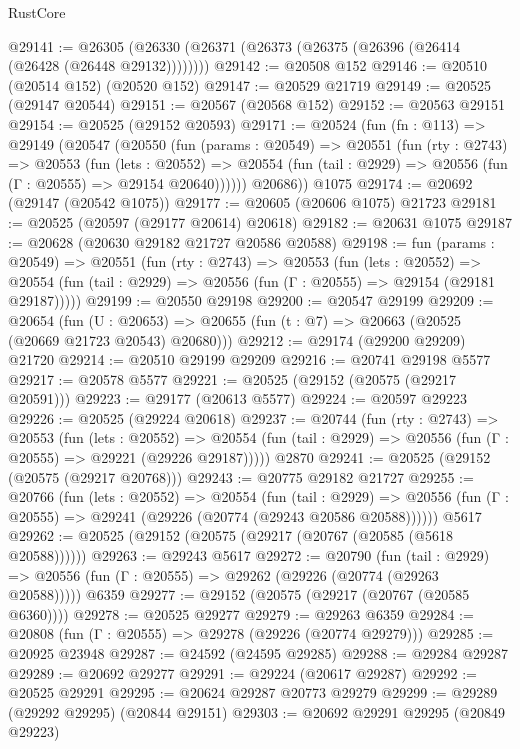 \begin{lexlean}{RustCore}
\begin{coremodule}
@29141 := @26305 (@26330 (@26371 (@26373 (@26375 (@26396 (@26414 (@26428 (@26448 @29132))))))))
@29142 := @20508 @152
@29146 := @20510 (@20514 @152) (@20520 @152)
@29147 := @20529 @21719
@29149 := @20525 (@29147 @20544)
@29151 := @20567 (@20568 @152)
@29152 := @20563 @29151
@29154 := @20525 (@29152 @20593)
@29171 := @20524
    (fun (fn : @113) =>
    @29149
      (@20547
        (@20550
          (fun (params : @20549) =>
          @20551
            (fun (rty : @2743) =>
            @20553
              (fun (lets : @20552) =>
              @20554 (fun (tail : @2929) => @20556 (fun (Γ : @20555) => @29154 @20640))))))
        @20686))
    @1075
@29174 := @20692 (@29147 (@20542 @1075))
@29177 := @20605 (@20606 @1075) @21723
@29181 := @20525 (@20597 (@29177 @20614) @20618)
@29182 := @20631 @1075
@29187 := @20628 (@20630 @29182 @21727 @20586 @20588)
@29198 := fun (params : @20549) =>
  @20551
    (fun (rty : @2743) =>
    @20553
      (fun (lets : @20552) =>
      @20554 (fun (tail : @2929) => @20556 (fun (Γ : @20555) => @29154 (@29181 @29187)))))
@29199 := @20550 @29198
@29200 := @20547 @29199
@29209 := @20654
    (fun (U : @20653) => @20655 (fun (t : @7) => @20663 (@20525 (@20669 @21723 @20543) @20680)))
@29212 := @29174 (@29200 @29209) @21720
@29214 := @20510 @29199 @29209
@29216 := @20741 @29198 @5577
@29217 := @20578 @5577
@29221 := @20525 (@29152 (@20575 (@29217 @20591)))
@29223 := @29177 (@20613 @5577)
@29224 := @20597 @29223
@29226 := @20525 (@29224 @20618)
@29237 := @20744
    (fun (rty : @2743) =>
    @20553
      (fun (lets : @20552) =>
      @20554 (fun (tail : @2929) => @20556 (fun (Γ : @20555) => @29221 (@29226 @29187)))))
    @2870
@29241 := @20525 (@29152 (@20575 (@29217 @20768)))
@29243 := @20775 @29182 @21727
@29255 := @20766
    (fun (lets : @20552) =>
    @20554
      (fun (tail : @2929) =>
      @20556 (fun (Γ : @20555) => @29241 (@29226 (@20774 (@29243 @20586 @20588))))))
    @5617
@29262 := @20525 (@29152 (@20575 (@29217 (@20767 (@20585 (@5618 @20588))))))
@29263 := @29243 @5617
@29272 := @20790
    (fun (tail : @2929) => @20556 (fun (Γ : @20555) => @29262 (@29226 (@20774 (@29263 @20588)))))
    @6359
@29277 := @29152 (@20575 (@29217 (@20767 (@20585 @6360))))
@29278 := @20525 @29277
@29279 := @29263 @6359
@29284 := @20808 (fun (Γ : @20555) => @29278 (@29226 (@20774 @29279)))
@29285 := @20925 @23948
@29287 := @24592 (@24595 @29285)
@29288 := @29284 @29287
@29289 := @20692 @29277
@29291 := @29224 (@20617 @29287)
@29292 := @20525 @29291
@29295 := @20624 @29287 @20773 @29279
@29299 := @29289 (@29292 @29295) (@20844 @29151)
@29303 := @20692 @29291 @29295 (@20849 @29223)

\end{coremodule}
\end{lexlean}

